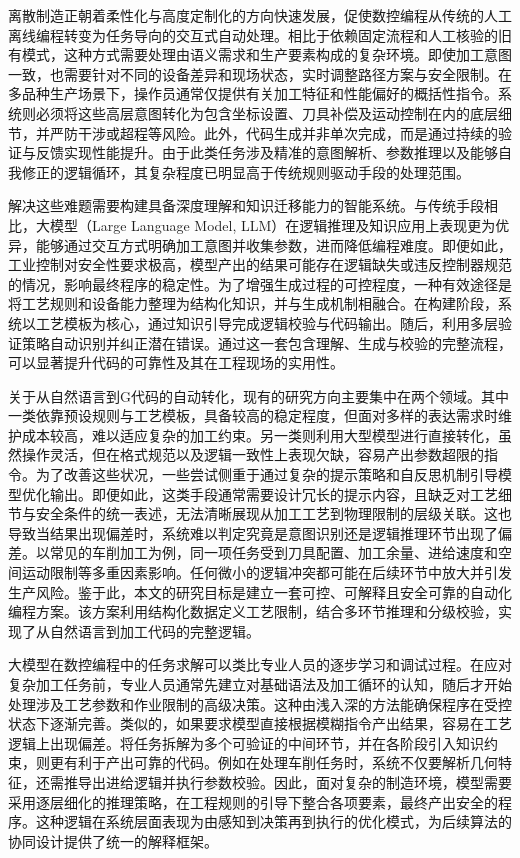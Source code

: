 \documentclass[journal,twoside,web]{ieeecolor}
\begin{document}
离散制造正朝着柔性化与高度定制化的方向快速发展，促使数控编程从传统的人工离线编程转变为任务导向的交互式自动处理。相比于依赖固定流程和人工核验的旧有模式，这种方式需要处理由语义需求和生产要素构成的复杂环境。即使加工意图一致，也需要针对不同的设备差异和现场状态，实时调整路径方案与安全限制。在多品种生产场景下，操作员通常仅提供有关加工特征和性能偏好的概括性指令。系统则必须将这些高层意图转化为包含坐标设置、刀具补偿及运动控制在内的底层细节，并严防干涉或超程等风险。此外，代码生成并非单次完成，而是通过持续的验证与反馈实现性能提升。由于此类任务涉及精准的意图解析、参数推理以及能够自我修正的逻辑循环，其复杂程度已明显高于传统规则驱动手段的处理范围。

解决这些难题需要构建具备深度理解和知识迁移能力的智能系统。与传统手段相比，大模型（Large Language Model, LLM）在逻辑推理及知识应用上表现更为优异，能够通过交互方式明确加工意图并收集参数，进而降低编程难度。即便如此，工业控制对安全性要求极高，模型产出的结果可能存在逻辑缺失或违反控制器规范的情况，影响最终程序的稳定性。为了增强生成过程的可控程度，一种有效途径是将工艺规则和设备能力整理为结构化知识，并与生成机制相融合。在构建阶段，系统以工艺模板为核心，通过知识引导完成逻辑校验与代码输出。随后，利用多层验证策略自动识别并纠正潜在错误。通过这一套包含理解、生成与校验的完整流程，可以显著提升代码的可靠性及其在工程现场的实用性。

关于从自然语言到G代码的自动转化，现有的研究方向主要集中在两个领域。其中一类依靠预设规则与工艺模板，具备较高的稳定程度，但面对多样的表达需求时维护成本较高，难以适应复杂的加工约束。另一类则利用大型模型进行直接转化，虽然操作灵活，但在格式规范以及逻辑一致性上表现欠缺，容易产出参数超限的指令。为了改善这些状况，一些尝试侧重于通过复杂的提示策略和自反思机制引导模型优化输出。即便如此，这类手段通常需要设计冗长的提示内容，且缺乏对工艺细节与安全条件的统一表述，无法清晰展现从加工工艺到物理限制的层级关联。这也导致当结果出现偏差时，系统难以判定究竟是意图识别还是逻辑推理环节出现了偏差。以常见的车削加工为例，同一项任务受到刀具配置、加工余量、进给速度和空间运动限制等多重因素影响。任何微小的逻辑冲突都可能在后续环节中放大并引发生产风险。鉴于此，本文的研究目标是建立一套可控、可解释且安全可靠的自动化编程方案。该方案利用结构化数据定义工艺限制，结合多环节推理和分级校验，实现了从自然语言到加工代码的完整逻辑。

大模型在数控编程中的任务求解可以类比专业人员的逐步学习和调试过程。在应对复杂加工任务前，专业人员通常先建立对基础语法及加工循环的认知，随后才开始处理涉及工艺参数和作业限制的高级决策。这种由浅入深的方法能确保程序在受控状态下逐渐完善。类似的，如果要求模型直接根据模糊指令产出结果，容易在工艺逻辑上出现偏差。将任务拆解为多个可验证的中间环节，并在各阶段引入知识约束，则更有利于产出可靠的代码。例如在处理车削任务时，系统不仅要解析几何特征，还需推导出进给逻辑并执行参数校验。因此，面对复杂的制造环境，模型需要采用逐层细化的推理策略，在工程规则的引导下整合各项要素，最终产出安全的程序。这种逻辑在系统层面表现为由感知到决策再到执行的优化模式，为后续算法的协同设计提供了统一的解释框架。
\end{document}
